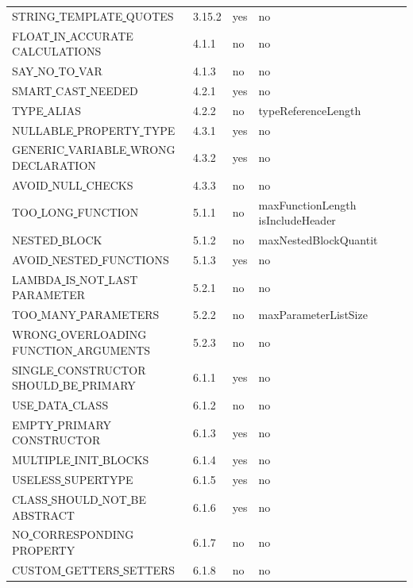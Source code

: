 \begin{longtable}{ |l|p{0.8cm}|p{0.8cm}| p{3cm} | }
STRING\underline{ }TEMPLATE\underline{ }QUOTES & 3.15.2 &  yes  &   no  \\
FLOAT\underline{ }IN\underline{ }ACCURATE\underline{ }CALCULATIONS & 4.1.1 &  no  &   no  \\
SAY\underline{ }NO\underline{ }TO\underline{ }VAR & 4.1.3 &  no  &   no  \\
SMART\underline{ }CAST\underline{ }NEEDED & 4.2.1 &  yes  &   no  \\
TYPE\underline{ }ALIAS & 4.2.2 &  no  &   typeReferenceLength        \\
NULLABLE\underline{ }PROPERTY\underline{ }TYPE & 4.3.1 &  yes  &   no  \\
GENERIC\underline{ }VARIABLE\underline{ }WRONG\underline{ }DECLARATION & 4.3.2 &  yes  &   no  \\
AVOID\underline{ }NULL\underline{ }CHECKS & 4.3.3 &  no  &   no  \\
TOO\underline{ }LONG\underline{ }FUNCTION & 5.1.1 &  no  &   maxFunctionLength isIncludeHeader\\
NESTED\underline{ }BLOCK & 5.1.2 &  no  &   maxNestedBlockQuantit\\
AVOID\underline{ }NESTED\underline{ }FUNCTIONS & 5.1.3 &  yes  &   no  \\
LAMBDA\underline{ }IS\underline{ }NOT\underline{ }LAST\underline{ }PARAMETER & 5.2.1 &  no  &   no \\
TOO\underline{ }MANY\underline{ }PARAMETERS & 5.2.2 &  no  &   maxParameterListSize \\
WRONG\underline{ }OVERLOADING\underline{ }FUNCTION\underline{ }ARGUMENTS & 5.2.3 &  no  &   no \\
SINGLE\underline{ }CONSTRUCTOR\underline{ }SHOULD\underline{ }BE\underline{ }PRIMARY & 6.1.1 &  yes  &   no  \\
USE\underline{ }DATA\underline{ }CLASS & 6.1.2 &  no  &   no  \\
EMPTY\underline{ }PRIMARY\underline{ }CONSTRUCTOR & 6.1.3 &  yes  &   no  \\
MULTIPLE\underline{ }INIT\underline{ }BLOCKS & 6.1.4 &  yes  &   no  \\
USELESS\underline{ }SUPERTYPE & 6.1.5 &  yes  &   no  \\
CLASS\underline{ }SHOULD\underline{ }NOT\underline{ }BE\underline{ }ABSTRACT & 6.1.6 &  yes  &   no  \\
NO\underline{ }CORRESPONDING\underline{ }PROPERTY & 6.1.7 &  no  &   no  \\
CUSTOM\underline{ }GETTERS\underline{ }SETTERS & 6.1.8 &  no  &   no  \\

\end{longtable}
